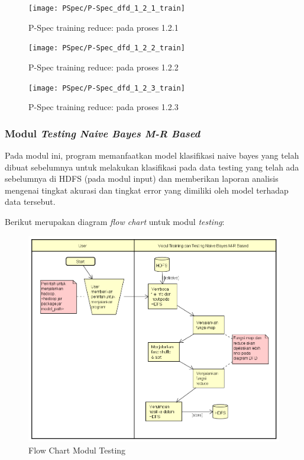 \begin{figure}[H]
	\centering
	\texttt{[image: PSpec/P-Spec\_dfd\_1\_2\_1\_train]}
	\caption[P-Spec training reduce: pada proses 1.2.1]{P-Spec training reduce: pada proses 1.2.1}
	\label{fig:P-Spec training reduce: pada proses 1.2.1}
\end{figure}

\begin{figure}[H]
	\centering
	\texttt{[image: PSpec/P-Spec\_dfd\_1\_2\_2\_train]}
	\caption[P-Spec training reduce: pada proses 1.2.2]{P-Spec training reduce: pada proses 1.2.2}
	\label{fig:P-Spec training reduce: pada proses 1.2.2}
\end{figure}

\begin{figure}[H]
	\centering
	\texttt{[image: PSpec/P-Spec\_dfd\_1\_2\_3\_train]}
	\caption[P-Spec training: pada proses 1.2.3]{P-Spec training reduce: pada proses 1.2.3}
	\label{fig:P-Spec training reduce: pada proses 1.2.3}
\end{figure}


\subsubsection{Modul \textit{Testing Naive Bayes M-R Based}}
\label{subsubsec:Modul Testing Naive Bayes M-R Based}

Pada modul ini, program memanfaatkan model klasifikasi naive bayes yang telah dibuat sebelumnya untuk melakukan klasifikasi pada data testing yang telah ada sebelumnya di HDFS (pada modul input) dan memberikan laporan analisis mengenai tingkat akurasi dan tingkat error yang dimiliki oleh model terhadap data tersebut. 

Berikut merupakan diagram \textit{flow chart} untuk modul \textit{testing}:

\begin{figure}[H]
	\centering
	\includegraphics[scale=0.6]{Diagram/Flowchart_Training_Testing_MR}
	\caption[Flow Chart Modul Testing]{Flow Chart Modul Testing}
	\label{fig:Flow Chart Modul Testing}
\end{figure}

